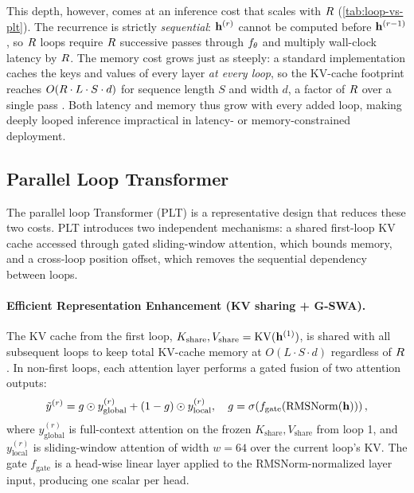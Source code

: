 This depth, however, comes at an inference cost that scales with $R$
(\autoref{tab:loop-vs-plt}).
The recurrence is strictly \emph{sequential}: $\mathbf{h}^{(r)}$ cannot be computed
before $\mathbf{h}^{(r-1)}$, so $R$ loops require $R$ successive
passes through $f_\theta$ and multiply wall-clock latency by $R$.
The memory cost grows just as steeply: a standard implementation caches the keys
and values of every layer \emph{at every loop}, so the KV-cache footprint reaches
$O(R \cdot L \cdot S \cdot d)$ for sequence length $S$ and width $d$, a
factor of $R$ over a single pass \citep{vendrell2026memoryefficient}.
Both latency and memory thus grow with every added loop, making deeply looped
inference impractical in latency- or memory-constrained deployment.

\subsection{Parallel Loop Transformer}
\label{sec:plt-arch}
The parallel loop Transformer (PLT) \citep{wu2025parallel} is a representative design that reduces these two costs. PLT introduces two independent mechanisms: a shared first-loop KV cache accessed through gated sliding-window attention, which bounds memory, and a cross-loop position offset,
which removes the sequential dependency between loops.

\paragraph{Efficient Representation Enhancement (KV sharing + G-SWA).}
The KV cache from the first loop,
$K_{\text{share}}, V_{\text{share}} = \mathrm{KV}(\mathbf{h}^{(1)})$,
is shared with all subsequent loops to keep total KV-cache memory at
$O(L \cdot S \cdot d)$ regardless of $R$.
In non-first loops, each attention layer performs a gated fusion of two
attention outputs:
\begin{equation}
  \tilde{y}^{(r)} = g \odot y_{\text{global}}^{(r)}
                   + (1 - g) \odot y_{\text{local}}^{(r)},
  \quad g = \sigma\!\left(f_{\text{gate}}(\mathrm{RMSNorm}(\mathbf{h}))\right),
  \label{eq:gswa}
\end{equation}
where $y_{\text{global}}^{(r)}$ is full-context attention on the frozen
$K_{\text{share}}, V_{\text{share}}$ from loop 1, and $y_{\text{local}}^{(r)}$
is sliding-window attention of width $w = 64$ over the current loop's KV. The gate $f_{\text{gate}}$ is a head-wise linear layer applied to the
RMSNorm-normalized layer input, producing one scalar per head.
